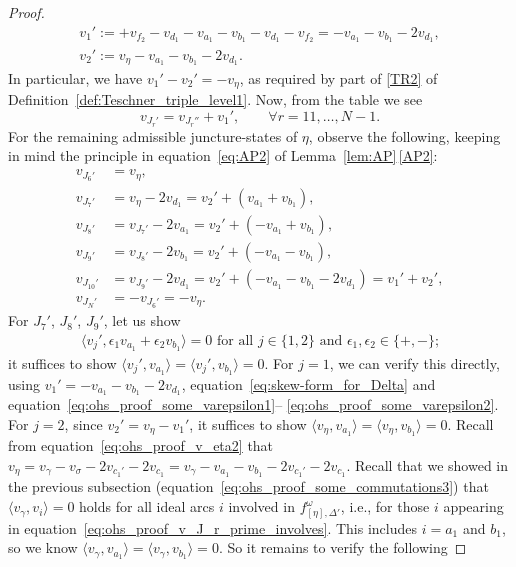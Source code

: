 \documentclass[pdftex]{sigma}
\numberwithin{equation}{section}
\theoremstyle{definition}
\begin{document}
\begin{proof}
\begin{gather*}
v_1' := +v_{f_2} - v_{d_1} - v_{a_1} - v_{b_1} - v_{d_1} - v_{f_2} = - v_{a_1} - v_{b_1} - 2 v_{d_1}, \\
v_2' := v_\eta - v_{a_1} - v_{b_1} - 2 v_{d_1}.
\end{gather*}
In particular, we have $v_1' - v_2' = - v_\eta$, as required by part of \ref{TR2} of Definition~\ref{def:Teschner_triple_level1}. Now, from the table we see
\[
v_{J_r'} = v_{J_r''} + v_1', \qquad \forall r = 11, \dots, N-1.
\]
For the remaining admissible juncture-states of $\eta$, observe the following, keeping in mind the principle in equation~\eqref{eq:AP2} of Lemma~\ref{lem:AP}\,\ref{AP2}:
\begin{align*}
v_{J_6'} & = v_\eta, \\
v_{J_7'} & = v_\eta - 2 v_{d_1} = v_2' + (v_{a_1} + v_{b_1}), \\
v_{J_8'} & = v_{J_7'} - 2 v_{a_1} = v_2' + (-v_{a_1} + v_{b_1}), \\
v_{J_9'} & = v_{J_8'} - 2 v_{b_1} = v_2' + (-v_{a_1} - v_{b_1}), \\
v_{J_{10}'} & = v_{J_9'} - 2 v_{d_1} = v_2' + (-v_{a_1} - v_{b_1} - 2v_{d_1}) = v_1' + v_2', \\
v_{J_N'} & = - v_{J_6'} = - v_\eta.
\end{align*}
For $J_7'$, $J_8'$, $J_9'$, let us show
\begin{align}
\label{eq:ohs_proof2_eqn1}
\mbox{$\langle v_j', \epsilon_1 v_{a_1} + \epsilon_2 v_{b_1} \rangle=0$ for all $j\in\{1,2\}$ and $\epsilon_1,\epsilon_2 \in \{+,-\}$;}
\end{align}
it suffices to show $\langle v_j', v_{a_1}\rangle=\langle v_j',v_{b_1}\rangle=0$. For $j=1$, we can verify this directly, using $v_1' = - v_{a_1} - v_{b_1} - 2v_{d_1}$, equation~\eqref{eq:skew-form_for_Delta} and equation~\eqref{eq:ohs_proof_some_varepsilon1}-- \eqref{eq:ohs_proof_some_varepsilon2}.
For $j=2$, since $v_2' = v_\eta - v_1'$, it suffices to show $\langle v_\eta,v_{a_1}\rangle = \langle v_\eta, v_{b_1}\rangle=0$. Recall from equation~\eqref{eq:ohs_proof_v_eta2} that $v_\eta = {v_\gamma} - {v_\sigma} - 2 {v_{c_1'}} - 2 {v_{c_1}} = v_\gamma - v_{a_1} - v_{b_1} - 2v_{c_1'} - 2v_{c_1}$. Recall that we showed in the previous subsection (equation~\eqref{eq:ohs_proof_some_commutations3}) that $\langle v_\gamma,v_i\rangle=0$ holds for all ideal arcs $i$ involved in $f^\omega_{[\eta],\Delta'}$, i.e., for those $i$ appearing in equation~\eqref{eq:ohs_proof_v_J_r_prime_involves}. This includes $i=a_1$ and $b_1$, so we know $\langle v_\gamma,v_{a_1}\rangle=\langle v_\gamma,v_{b_1}\rangle=0$. So it remains to verify the following

\end{proof}
\end{document}
